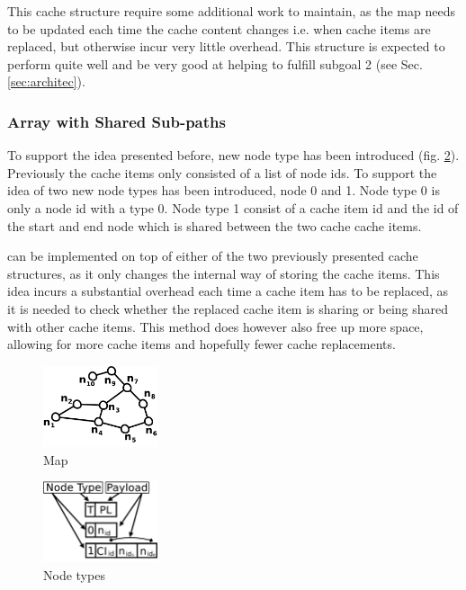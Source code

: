 This cache structure require some additional work to maintain, as the map needs to be updated each time the cache content changes i.e. when cache items are replaced, but otherwise incur very little overhead. This structure is expected to perform quite well and be very good at helping to fulfill subgoal 2 (see Sec. \ref{sec:architec}).

\subsubsection{Array with Shared Sub-paths}
To support the \sps idea presented before, new node type has been introduced (fig. \ref{fig:nodetypes}). Previously the cache items only consisted of a list of node ids. To support the idea of \sps two new node types has been introduced, node 0 and 1. Node type 0 is only a node id with a type 0. Node type 1 consist of a cache item id and the id of the start and end node which is shared between the two cache cache items.

can be implemented on top of either of the two previously presented cache structures, as it only changes the internal way of storing the cache items. This idea incurs a substantial overhead each time a cache item has to be replaced, as it is needed to check whether the replaced cache item is sharing or being shared with other cache items. This method does however also free up more space, allowing for more cache items and hopefully fewer cache replacements.


\begin{figure}
  \center
	\includegraphics[width=0.3\textwidth]{figures/map10n.pdf}
	\caption{Map}
  \label{fig:map10}
\end{figure}

\begin{figure}
  \center
	\includegraphics[width=0.3\textwidth]{figures/nodeType.pdf}
	\caption{Node types}
  \label{fig:nodetypes}
\end{figure}

